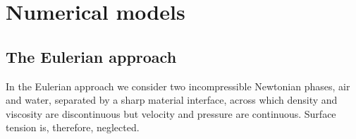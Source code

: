 \documentclass[final,3p,times]{elsarticle}
\begin{document}
\section{Numerical models}\label{sec:numerics}
\subsection{The Eulerian approach}\label{sec:Eulerian}

In the Eulerian approach we consider two incompressible Newtonian phases, air and water, separated by a sharp material interface, across which density and viscosity are discontinuous but velocity and pressure are continuous. Surface tension is, therefore, neglected.

\end{document}
